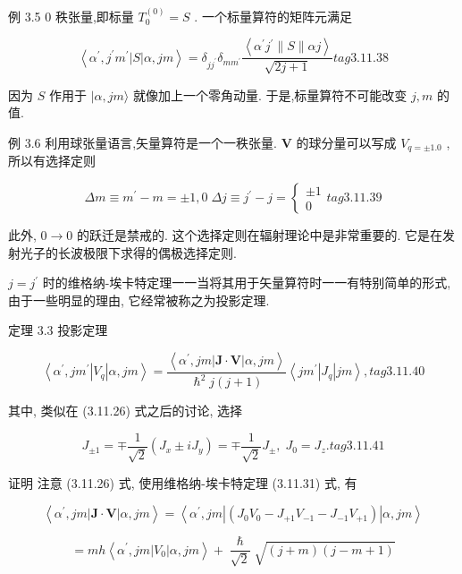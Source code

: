 例 3.5 0 秩张量,即标量 ${T}_{0}^{\left( 0\right) } = S$ . 一个标量算符的矩阵元满足

$$
\left\langle {{\alpha }^{\prime },{j}^{\prime }{m}^{\prime }\left| S\right| \alpha ,{jm}}\right\rangle = {\delta }_{j{j}^{\prime }}{\delta }_{m{m}^{\prime }}\frac{\left\langle {\alpha }^{\prime }{j}^{\prime }\parallel S\parallel \alpha j\right\rangle }{\sqrt{{2j} + 1}} tag{3.11.38}
$$

因为 $S$ 作用于 $|\alpha ,{jm}\rangle$ 就像加上一个零角动量. 于是,标量算符不可能改变 $j, m$ 的值.

例 3.6 利用球张量语言,矢量算符是一个一秩张量. $\mathbf{V}$ 的球分量可以写成 ${V}_{q = \pm {1.0}}$ ,所以有选择定则

$$
{\Delta m} \equiv {m}^{\prime } - m = \pm 1,0\;{\Delta j} \equiv {j}^{\prime } - j = \left\{ \begin{array}{l} \pm 1 \\ 0 \end{array}\right. tag{3.11.39}
$$

此外, $0 \rightarrow 0$ 的跃迁是禁戒的. 这个选择定则在辐射理论中是非常重要的. 它是在发射光子的长波极限下求得的偶极选择定则.

$j = {j}^{\prime }$ 时的维格纳-埃卡特定理一一当将其用于矢量算符时一一有特别简单的形式,由于一些明显的理由, 它经常被称之为投影定理.

定理 3.3 投影定理

$$
\left\langle {{\alpha }^{\prime }, j{m}^{\prime }\left| {V}_{q}\right| \alpha ,{jm}}\right\rangle = \frac{\left\langle {\alpha }^{\prime }, jm\left| \mathbf{J} \cdot \mathbf{V}\right| \alpha, jm\right\rangle }{{\hslash }^{2}j\left( {j + 1}\right) }\left\langle {j{m}^{\prime }\left| {J}_{q}\right| {jm}}\right\rangle , tag{3.11.40}
$$

其中, 类似在 (3.11.26) 式之后的讨论, 选择

$$
{J}_{\pm 1} = \mp \frac{1}{\sqrt{2}}\left( {{J}_{x} \pm i{J}_{y}}\right) = \mp \frac{1}{\sqrt{2}}{J}_{ \pm },\;{J}_{0} = {J}_{z}. tag{3.11.41}
$$

证明 注意 (3.11.26) 式, 使用维格纳-埃卡特定理 (3.11.31) 式, 有

$$
\left\langle {{\alpha }^{\prime },{jm}\left| {\mathbf{J} \cdot \mathbf{V}}\right| \alpha ,{jm}}\right\rangle = \left\langle {{\alpha }^{\prime },{jm}\left| \left( {{J}_{0}{V}_{0} - {J}_{+1}{V}_{-1} - {J}_{-1}{V}_{+1}}\right) \right| \alpha ,{jm}}\right\rangle
$$

$$
= {mh}\left\langle {{\alpha }^{\prime },{jm}\left| {V}_{0}\right| \alpha ,{jm}}\right\rangle + \frac{\hslash }{\sqrt{2}}\sqrt{\left( {j + m}\right) \left( {j - m + 1}\right) }
$$

